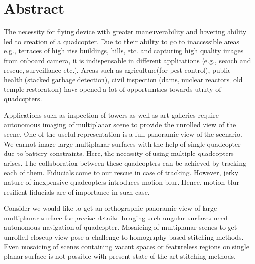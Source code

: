 \chapter*{Abstract}
The necessity for flying device with greater maneuverability and hovering
ability led to creation of a quadcopter.  Due to their ability to go to
inaccessible areas e.g., terraces of high rise buildings, hills, etc. and
capturing high quality images from onboard camera, it is indispensable in
different applications (e.g., search and rescue,  surveillance etc.).
Areas such as agriculture(for pest control), public health (stacked garbage
detection), civil inspection (dams, nuclear reactors, old temple restoration)
have opened a lot of opportunities towards utility of quadcopters.

Applications such as inspection of towers as well as art galleries require autonomous
imaging of multiplanar scene to provide the unrolled view of the scene. One of
the useful representation is a full panoramic view of the scenario. We cannot image large
multiplanar surfaces with the help of single quadcopter due to battery constraints. Here, the necessity
of using multiple quadcopters arises. The collaboration between these quadcopters can be
achieved by tracking each of them. Fiducials come to our rescue in case of tracking. However,
jerky nature of inexpensive quadcopters introduces motion blur. Hence, motion blur resilient fiducials
are of importance in such case.

Consider we would like to get an orthographic panoramic view of large multiplanar surface for precise details.
Imaging such angular surfaces need autonomous navigation of quadcopter. Mosaicing of multiplanar scenes
to get unrolled closeup view pose a challenge to homography based stitching methods. Even mosaicing of scenes
containing vacant spaces or featureless regions on single planar surface is not possible with present state of the art
stitching methods.
 

